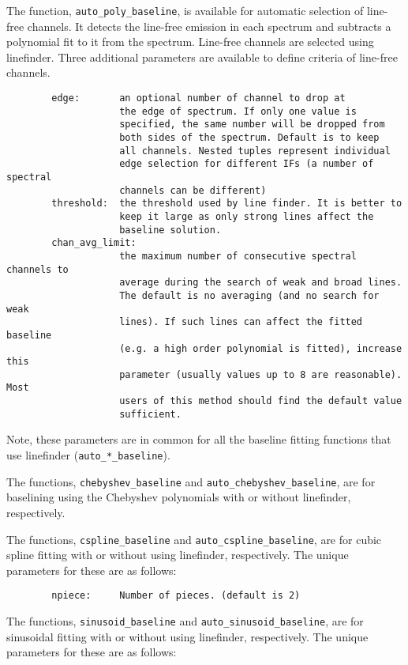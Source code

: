 The function, {\tt auto\_poly\_baseline}, is available for automatic 
selection of line-free channels.
It detects the line-free emission in each spectrum and subtracts a 
polynomial fit to it from the spectrum. 
Line-free channels are selected using linefinder. Three additional
parameters are available to define criteria of line-free channels.
\small
\begin{verbatim}
        edge:       an optional number of channel to drop at
                    the edge of spectrum. If only one value is
                    specified, the same number will be dropped from
                    both sides of the spectrum. Default is to keep
                    all channels. Nested tuples represent individual
                    edge selection for different IFs (a number of spectral
                    channels can be different)
        threshold:  the threshold used by line finder. It is better to
                    keep it large as only strong lines affect the
                    baseline solution.
        chan_avg_limit:
                    the maximum number of consecutive spectral channels to
                    average during the search of weak and broad lines.
                    The default is no averaging (and no search for weak
                    lines). If such lines can affect the fitted baseline
                    (e.g. a high order polynomial is fitted), increase this
                    parameter (usually values up to 8 are reasonable). Most
                    users of this method should find the default value
                    sufficient.
\end{verbatim}
\normalsize
Note, these parameters are in common for all the baseline fitting functions 
that use linefinder ({\tt auto\_*\_baseline}). 

The functions, {\tt chebyshev\_baseline} and {\tt auto\_chebyshev\_baseline}, 
are for baselining using the Chebyshev polynomials with or without linefinder, 
respectively. 

The functions, {\tt cspline\_baseline} and {\tt auto\_cspline\_baseline}, 
are for cubic spline fitting with or without using linefinder, respectively. 
The unique parameters for these are as follows:

\small
\begin{verbatim}
        npiece:     Number of pieces. (default is 2)
\end{verbatim}
\normalsize

The functions, {\tt sinusoid\_baseline} and {\tt auto\_sinusoid\_baseline}, 
are for sinusoidal fitting with or without using linefinder, respectively. 
The unique parameters for these are as follows:

